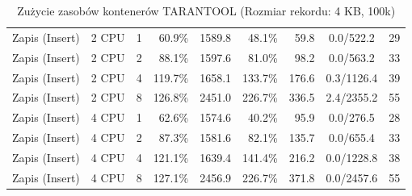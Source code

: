 \begin{table}[ht]
{\begin{tabular}{llcrrrrcc}
Zapis (Insert) & 2 CPU & 1 & 60.9\% & 1589.8 & 48.1\% & 59.8 & 0.0/522.2 & 29 \\
Zapis (Insert) & 2 CPU & 2 & 88.1\% & 1597.6 & 81.0\% & 98.2 & 0.0/563.2 & 33 \\
Zapis (Insert) & 2 CPU & 4 & 119.7\% & 1658.1 & 133.7\% & 176.6 & 0.3/1126.4 & 39 \\
Zapis (Insert) & 2 CPU & 8 & 126.8\% & 2451.0 & 226.7\% & 336.5 & 2.4/2355.2 & 55 \\
Zapis (Insert) & 4 CPU & 1 & 62.6\% & 1574.6 & 40.2\% & 95.9 & 0.0/276.5 & 28 \\
Zapis (Insert) & 4 CPU & 2 & 87.3\% & 1581.6 & 82.1\% & 135.7 & 0.0/655.4 & 33 \\
Zapis (Insert) & 4 CPU & 4 & 121.1\% & 1639.4 & 141.4\% & 216.2 & 0.0/1228.8 & 38 \\
Zapis (Insert) & 4 CPU & 8 & 127.1\% & 2456.9 & 226.7\% & 371.8 & 0.0/2457.6 & 55 \\
\bottomrule
\end{tabular}%
}
\caption{Zużycie zasobów kontenerów TARANTOOL (Rozmiar rekordu: 4 KB, 100k)}
\label{tab:resources_tarantool_medium_100000}
\end{table}
